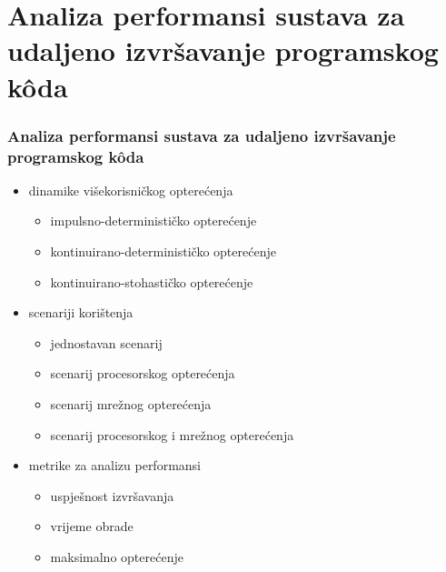 \documentclass{beamer}
\newif\ifplacelogo
\begin{document}


\section{Analiza performansi sustava za udaljeno izvršavanje programskog kôda}
\begin{frame}
\frametitle{Analiza performansi sustava za udaljeno izvršavanje programskog kôda}
\begin{itemize}
	\item dinamike višekorisničkog opterećenja
	\begin{itemize}
		\item impulsno-determinističko opterećenje
		\item kontinuirano-determinističko opterećenje
		\item kontinuirano-stohastičko opterećenje
	\end{itemize}
	\item scenariji korištenja
	\begin{itemize}
		\item jednostavan scenarij
		\item scenarij procesorskog opterećenja
		\item scenarij mrežnog opterećenja
		\item scenarij procesorskog i mrežnog opterećenja
	\end{itemize}
	\item metrike za analizu performansi
	\begin{itemize}
		\item uspješnost izvršavanja
		\item vrijeme obrade
		\item maksimalno opterećenje
	\end{itemize}
\end{itemize}
\end{frame}
\end{document}
